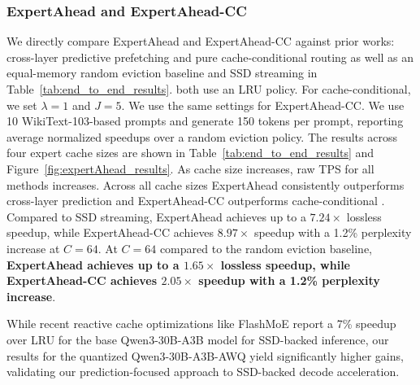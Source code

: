 \subsubsection{ExpertAhead and ExpertAhead-CC}
We directly compare ExpertAhead and ExpertAhead-CC against  prior works: cross-layer predictive prefetching \cite{eliseev2023fastinferencemixtureofexpertslanguage} and pure cache-conditional routing \cite{skliar2025mixturecacheconditionalexpertsefficient} as well as an equal-memory random eviction baseline and SSD streaming in Table~\ref{tab:end_to_end_results}. \cite{eliseev2023fastinferencemixtureofexpertslanguage,skliar2025mixturecacheconditionalexpertsefficient} both use an LRU policy. For cache-conditional, we set $\lambda=1$ and $J=5$. We use the same settings for ExpertAhead-CC. We use 10 WikiText-103-based prompts and generate 150 tokens per prompt, reporting average normalized speedups over a random eviction policy. The results across four expert cache sizes are shown in Table~\ref{tab:end_to_end_results} and Figure~\ref{fig:expertAhead_results}. As cache size increases, raw TPS for all methods increases. Across all cache sizes ExpertAhead consistently outperforms cross-layer prediction \cite{eliseev2023fastinferencemixtureofexpertslanguage} and ExpertAhead-CC outperforms cache-conditional \cite{skliar2025mixturecacheconditionalexpertsefficient}. Compared to SSD streaming, ExpertAhead achieves up to a $7.24\times$ lossless speedup, while ExpertAhead-CC achieves $8.97\times$ speedup with a 1.2\% perplexity increase at $C=64$. At $C=64$ compared to the random eviction baseline, \textbf{ExpertAhead achieves up to a $1.65\times$ lossless speedup, while ExpertAhead-CC achieves $2.05\times$ speedup with a 1.2\% perplexity increase}.


While recent reactive cache optimizations like FlashMoE \cite{kim2026flashmoereducingssdio} report a 7\% speedup over LRU for the base Qwen3-30B-A3B model for SSD-backed inference, our results for the quantized Qwen3-30B-A3B-AWQ yield significantly higher gains, validating our prediction-focused approach to SSD-backed decode acceleration. 

